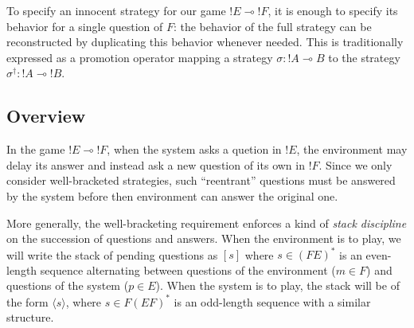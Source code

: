\documentclass[format=sigplan,authordraft]{acmart}
\begin{document}
To specify an innocent strategy
for our game ${!E} \multimap {!F}$,
it is enough to specify its behavior
for a single question of $F$:
the behavior of the full strategy can be reconstructed
by duplicating this behavior whenever needed.
This is traditionally expressed as a promotion operator
mapping a strategy $\sigma : {!A} \multimap B$
to the strategy $\sigma^\dagger : {!A} \multimap {!B}$.

\subsection{Overview} %
\label{sec:arrow}

In the game ${!E} \multimap {!F}$,
when the system asks a quetion in ${!E}$,
the environment may delay its answer
and instead ask a new question of its own in ${!F}$.
Since we only consider well-bracketed strategies,
such ``reentrant'' questions must be answered by the system
before then environment can answer the original one.

More generally,
the well-bracketing requirement
enforces a kind of \emph{stack discipline}
on the succession of questions and answers.
When the environment is to play,
we will write the stack of pending questions as
$[s]$ where $s \in (FE)^*$ is an even-length sequence
alternating between questions of the environment ($m \in F$)
and questions of the system ($p \in E$).
When the system is to play,
the stack will be of the form $\langle s \rangle$,
where $s \in F (EF)^*$ is an odd-length sequence
with a similar structure.
\end{document}
